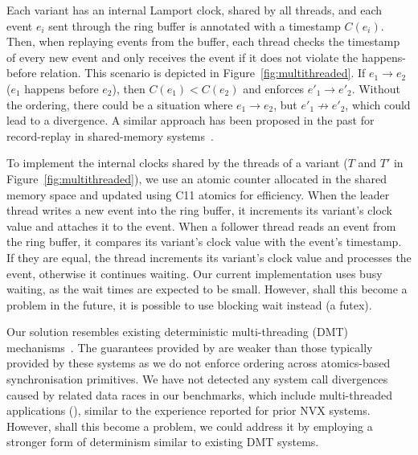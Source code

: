 Each variant has an internal Lamport clock, shared by all threads, and
each event $e_i$ sent through the ring buffer is annotated with a
timestamp $C(e_i)$.  Then, when replaying events from the buffer, each
thread checks the timestamp of every new event and only receives the
event if it does not violate the happens-before relation. This
scenario is depicted in Figure~\ref{fig:multithreaded}. If $e_1\to
e_2$ ($e_1$ happens before $e_2$), then $C(e_1)<C(e_2)$ and \varan
enforces $e'_1\to e'_2$. Without the ordering, there could be a
situation where $e_1\to e_2$, but $e'_1\not\to e'_2$, which could lead
to a divergence. A similar approach has been proposed in the past for
record-replay in shared-memory systems~\cite{levrouw94}.

To implement the internal clocks shared by the threads of a variant
($T$ and $T'$ in Figure~\ref{fig:multithreaded}),
we use an atomic counter allocated in the shared memory space and
updated using C11 atomics for efficiency.  When the leader thread
writes a new event into the ring buffer, it increments its variant's
clock value and attaches it to the event.  When a follower thread
reads an event from the ring buffer, it compares its variant's clock
value with the event's timestamp.  If they are equal, the thread
increments its variant's clock value and processes the event,
otherwise it continues waiting. Our current implementation uses busy
waiting, as the wait times are expected to be small.  However, shall
this become a problem in the future, it is possible to use blocking
wait instead (\eg a futex).


Our solution resembles existing deterministic multi-threading (DMT)
mechanisms~\cite{coredet:asplos10,dthreads:sosp11}. The guarantees
provided by \varan are weaker than those typically provided by these
systems as we do not enforce ordering across atomics-based
synchronisation primitives. We have not detected any system call
divergences caused by related data races in our benchmarks, which
include multi-threaded applications (\eg \redis), similar to the
experience reported for prior NVX systems. However, shall this become
a problem, we could address it by employing a stronger form of
determinism similar to existing DMT systems.

